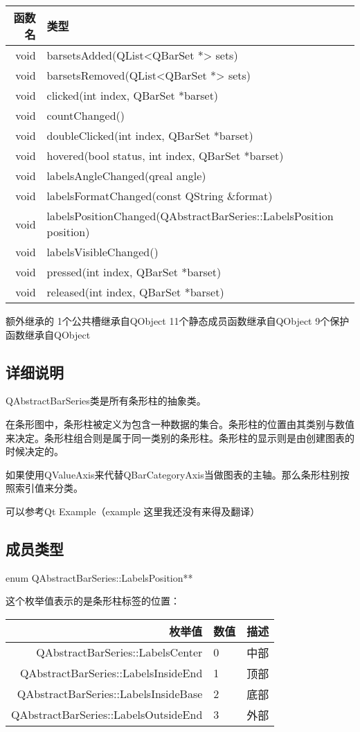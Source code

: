 \begin{tabular}{|r|l|}
\hline
函数名 & 类型 \\
\hline
void&	barsetsAdded(QList<QBarSet *> sets)\\
\hline
void&	barsetsRemoved(QList<QBarSet *> sets)\\
\hline
void&	clicked(int index, QBarSet *barset)\\
\hline
void&	countChanged()\\
\hline
void&	doubleClicked(int index, QBarSet *barset)\\
\hline
void&	hovered(bool status, int index, QBarSet *barset)\\
\hline
void&	labelsAngleChanged(qreal angle)\\
\hline
void&	labelsFormatChanged(const QString \&format)\\
\hline
void&	labelsPositionChanged(QAbstractBarSeries::LabelsPosition position)\\
\hline
void&	labelsVisibleChanged()\\
\hline
void&	pressed(int index, QBarSet *barset)\\
\hline
void&	released(int index, QBarSet *barset)\\
\hline
\end{tabular}

\splitLine

额外继承的
1个公共槽继承自QObject 11个静态成员函数继承自QObject 9个保护函数继承自QObject

\splitLine

\subsection{详细说明}

QAbstractBarSeries类是所有条形柱的抽象类。

在条形图中，条形柱被定义为包含一种数据的集合。条形柱的位置由其类别与数值来决定。条形柱组合则是属于同一类别的条形柱。条形柱的显示则是由创建图表的时候决定的。

如果使用QValueAxis来代替QBarCategoryAxis当做图表的主轴。那么条形柱别按照索引值来分类。

可以参考Qt Example（example 这里我还没有来得及翻译）

\splitLine

\subsection{成员类型}

enum QAbstractBarSeries::LabelsPosition**

这个枚举值表示的是条形柱标签的位置：

\begin{tabular}{|r|l|c|}
\hline
枚举值 & 数值 & 描述\\
\hline
QAbstractBarSeries::LabelsCenter&	0&	中部\\
\hline
QAbstractBarSeries::LabelsInsideEnd&	1&	顶部\\
\hline
QAbstractBarSeries::LabelsInsideBase&	2&	底部\\
\hline
QAbstractBarSeries::LabelsOutsideEnd&	3&	外部\\
\hline
\end{tabular}

